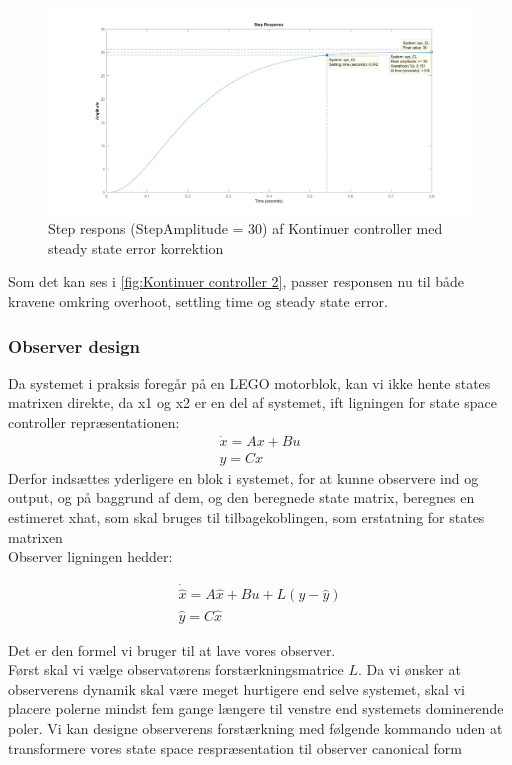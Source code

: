 \begin{figure}[H]
	\centering
	\includegraphics[width = 1\textwidth]{figur/Step_continues_2}
	\caption{Step respons (StepAmplitude = 30) af Kontinuer controller med steady state error korrektion}
	\label{fig:Kontinuer controller 2}
\end{figure}

Som det kan ses i \autoref{fig:Kontinuer controller 2}, passer responsen nu til både kravene omkring overhoot, settling time og steady state error.




\subsubsection{Observer design}
\label{sec:Observer design}
Da systemet i praksis foregår på en LEGO motorblok, kan vi ikke hente states matrixen direkte, da x1 og x2 er en del  af systemet, ift ligningen for state space controller repræsentationen: 
\begin{gather}
\dot{x}=Ax+Bu \\
y=Cx
\end{gather}
Derfor indsættes yderligere en blok i systemet, for at kunne observere ind og output, og på baggrund af dem, og den beregnede state matrix, beregnes en estimeret xhat, som skal bruges til tilbagekoblingen, som erstatning for states matrixen \\
Observer ligningen hedder:


\begin{gather}
\dot{\hat{x}}=A\hat{x}+Bu+L(y-\hat{y}) \\
\hat{y}=C\hat{x}
\end{gather}


Det er den formel vi bruger til at lave vores observer.\\

Først skal vi vælge observatørens forstærkningsmatrice $ L $. Da vi ønsker at observerens dynamik skal være meget hurtigere end selve systemet, skal vi placere polerne mindst fem gange længere til venstre end systemets dominerende poler. Vi kan designe observerens forstærkning med følgende kommando uden at transformere vores state space respræsentation til observer canonical form

